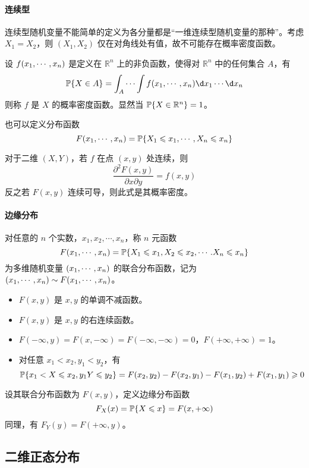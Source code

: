 \paragraph{连续型}
连续型随机变量不能简单的定义为各分量都是“一维连续型随机变量的那种”。考虑 $X_1 = X_2$，则 $(X_1, X_2)$ 仅在对角线处有值，故不可能存在概率密度函数。

\begin{definition}
	设 $f(x_1,\cdots,x_n)$ 是定义在 $\mathbb{R}^n$ 上的非负函数，使得对 $\mathbb{R}^n$ 中的任何集合 $A$，有
	\[ \bbP\{X \in A\} = \int_A \cdots \int f(\seq{x}{n}) \d x_1 \cdots \d x_n \]
	则称 $f$ 是 $X$ 的概率密度函数。显然当 $\mathbb{P}\{ X \in \mathbb{R}^n\} = 1$。
\end{definition}

也可以定义分布函数
\[ F(x_1,\cdots,x_n) = \mathbb{P}\{X_1 \leqslant x_1, \cdots, X_n \leqslant x_n \} \]

对于二维 $(X, Y)$，若 $f$ 在点 $(x, y)$ 处连续，则
\[ \frac{\partial^2 F(x, y)}{\partial x \partial y} = f(x, y) \]
反之若 $F(x, y)$ 连续可导，则此式是其概率密度。

\paragraph{边缘分布}

对任意的 $n$ 个实数，$x_1, x_2, \cdots, x_n$，称 $n$ 元函数
\[ F(x_1,\cdots,x_n) = \mathbb{P}\{X_1 \leqslant x_1, X_2 \leqslant x_2, \cdots. X_n \leqslant x_n\} \]
为多维随机变量 $(x_1,\cdots,x_n)$ 的联合分布函数，记为 $(x_1,\cdots,x_n) \sim F(x_1,\cdots,x_n)$。

\begin{itemize}
	\item $F(x, y)$ 是 $x, y$ 的单调不减函数。
	\item $F(x, y)$ 是 $x, y$ 的右连续函数。
	\item $F(-\infty, y) = F(x, -\infty) = F(-\infty, -\infty) = 0$，$F(+\infty, +\infty) = 1$。
	\item 对任意 $x_1 < x_2, y_1 < y_2$，有
	      \[ \mathbb{P}\{x_1 < X \leqslant x_2, y_1 Y \leqslant y_2\} = F(x_2, y_2) - F(x_2, y_1) - F(x_1, y_2) + F(x_1, y_1) \geqslant 0 \]
\end{itemize}

设其联合分布函数为 $F(x,y)$，定义边缘分布函数
\[ F_X(x) = \mathbb{P}\{X \leqslant x\} = F(x, +\infty) \]
同理，有 $F_Y(y) = F(+\infty, y)$。



\subsection{二维正态分布}

